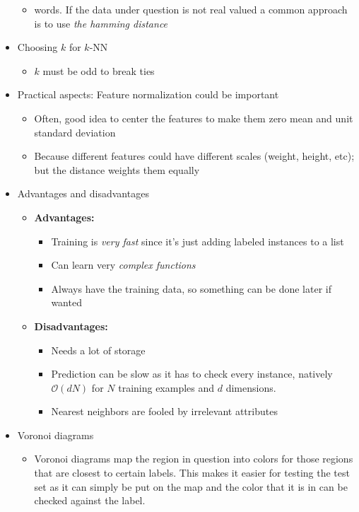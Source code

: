 \documentclass{article}
\begin{document}
\begin{itemize}
\begin{itemize}
	\item words. If the data under question is not real valued a common approach is to use \textit{the hamming distance}
	\end{itemize}
\item Choosing $k$ for $k$-NN
	\begin{itemize}
	\item $k$ must be odd to break ties
	\end{itemize}
\item Practical aspects: Feature normalization could be important
	\begin{itemize}
	\item Often, good idea to center the features to make them zero mean and unit standard deviation
	\item Because different features could have different scales (weight, height, etc); but the distance weights them equally
	\end{itemize}
\item Advantages and disadvantages
	\begin{itemize}
	\item {\bf Advantages:}
		\begin{itemize}
		\item Training is {\em very fast} since it's just adding labeled instances to a list
		\item Can learn very {\em complex functions}
		\item Always have the training data, so something can be done later if wanted
		\end{itemize}
	\item {\bf Disadvantages:}
		\begin{itemize}
		\item Needs a lot of storage
		\item Prediction can be slow as it has to check every instance, natively $\mathcal{O}(dN)$ for $N$ training examples and $d$ dimensions.
		\item Nearest neighbors are fooled by irrelevant attributes
		\end{itemize}
	\end{itemize}
\item Voronoi diagrams
	\begin{itemize}
	\item Voronoi diagrams map the region in question into colors for those regions that are closest to certain labels. This makes it easier for testing the test set as it can simply be put on the map and the color that it is in can be checked against the label.

\end{itemize}
\end{itemize}
\end{document}
